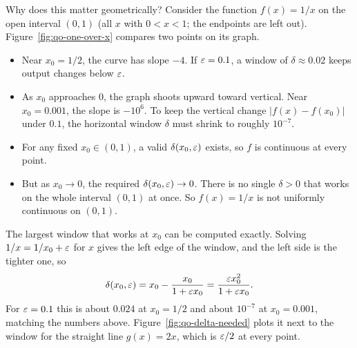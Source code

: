 Why does this matter geometrically? Consider the function $f(x) = 1/x$ on the open interval $(0, 1)$ (all $x$ with $0 < x < 1$; the endpoints are left out). Figure~\ref{fig:qo-one-over-x} compares two points on its graph.
\begin{itemize}
\item Near $x_0 = 1/2$, the curve has slope $-4$. If $\varepsilon = 0.1$, a window of $\delta \approx 0.02$ keeps output changes below $\varepsilon$.
\item As $x_0$ approaches $0$, the graph shoots upward toward vertical. Near $x_0 = 0.001$, the slope is $-10^6$. To keep the vertical change $|f(x) - f(x_0)|$ under $0.1$, the horizontal window $\delta$ must shrink to roughly $10^{-7}$.
\item For any fixed $x_0 \in (0, 1)$, a valid $\delta(x_0, \varepsilon)$ exists, so $f$ is continuous at every point.
\item But as $x_0 \to 0$, the required $\delta(x_0, \varepsilon) \to 0$. There is no single $\delta > 0$ that works on the whole interval $(0, 1)$ at once. So $f(x) = 1/x$ is not uniformly continuous on $(0, 1)$.
\end{itemize}
The largest window that works at $x_0$ can be computed exactly. Solving $1/x = 1/x_0 + \varepsilon$ for $x$ gives the left edge of the window, and the left side is the tighter one, so
\[
\delta(x_0, \varepsilon) = x_0 - \frac{x_0}{1 + \varepsilon x_0} = \frac{\varepsilon x_0^2}{1 + \varepsilon x_0}.
\]
For $\varepsilon = 0.1$ this is about $0.024$ at $x_0 = 1/2$ and about $10^{-7}$ at $x_0 = 0.001$, matching the numbers above. Figure~\ref{fig:qo-delta-needed} plots it next to the window for the straight line $g(x) = 2x$, which is $\varepsilon/2$ at every point.

